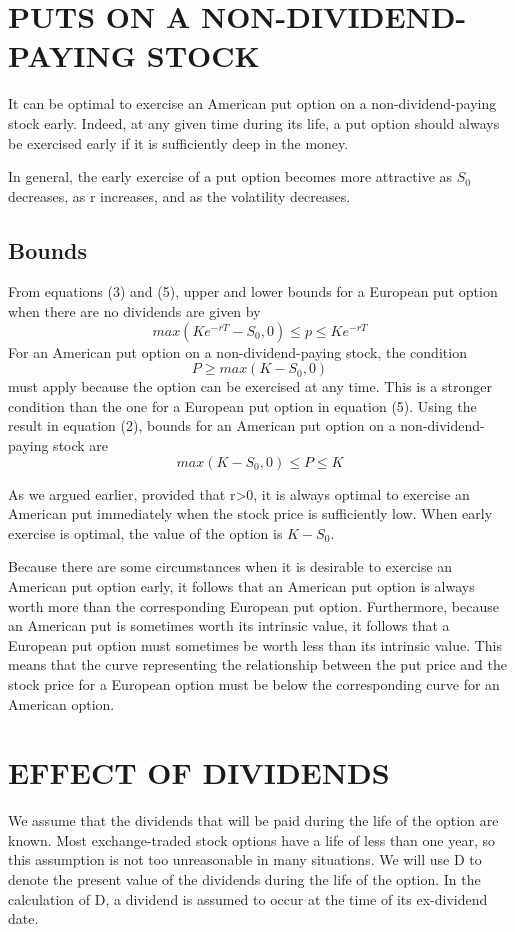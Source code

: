 \documentclass{article}
\begin{document}
\section{PUTS ON A NON-DIVIDEND-PAYING STOCK}
It can be optimal to exercise an American put option on a non-dividend-paying stock early. Indeed, at any given time during its life, a put option should always be exercised early if it is sufficiently deep in the money.

In general, the early exercise of a put option becomes more attractive as $ S_0 $ decreases, as r increases, and as the volatility decreases.

\subsection{Bounds}
From equations (3) and (5), upper and lower bounds for a European put option when there are no dividends are given by
\[
max(Ke^{-rT}-S_0,0)\le p\le Ke^{-rT}
\]
For an American put option on a non-dividend-paying stock, the condition
\[
P\ge max(K-S_0,0)
\]
must apply because the option can be exercised at any time. This is a stronger condition than the one for a European put option in equation (5). Using the result in equation (2), bounds for an American put option on a non-dividend-paying stock are
\[
max(K-S_0,0)\le P\le K
\]

As we argued earlier, provided that r>0, it is always optimal to exercise an American put immediately when the stock price is sufficiently low. When early exercise is optimal, the value of the option is $ K-S_0 $.

Because there are some circumstances when it is desirable to exercise an American put option early, it follows that an American put option is always worth more than the corresponding European put option. Furthermore, because an American put is sometimes worth its intrinsic value, it follows that a European put option must sometimes be worth less than its intrinsic value. This means that the curve representing the relationship between the put price and the stock price for a European option must be below the corresponding curve for an American option.

\section{EFFECT OF DIVIDENDS}
We assume that the dividends that will be paid during the life of the option are known. Most exchange-traded stock options have a life of less than one year, so this assumption is not too unreasonable in many situations. We will use D to denote the present value of the dividends during the life of the option. In the calculation of D, a dividend is assumed to occur at the time of its ex-dividend date.
\end{document}
